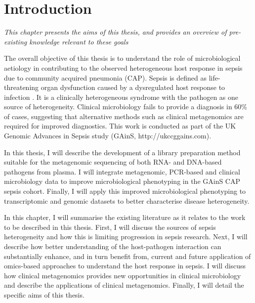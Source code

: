 \chapter{Introduction}
\label{ch:Introduction}
\textit{This chapter presents the aims of this thesis, and provides an overview of pre-existing knowledge relevant to these goals}

\startcontents[chapters]{\vspace{-1.4cm}}
\singlespacing
{}
\doublespacing
\vspace{0.5cm}

The overall objective of this thesis is to understand the role of microbiological aetiology in contributing to the observed heterogeneous host response in sepsis due to community acquired pneumonia (CAP). Sepsis is defined as life-threatening organ dysfunction caused by a dysregulated host response to infection \parencite{Singer2016}. It is a clinically heterogeneous syndrome with the pathogen as one source of heterogeneity. Clinical microbiology fails to provide a diagnosis in 60\% of cases, suggesting that alternative methods such as clinical metagenomics are required for improved diagnostics. This work is conducted as part of the UK Genomic Advances in Sepsis study (GAinS, http://ukccggains.com). 

In this thesis, I will describe the development of a library preparation method suitable for the metagenomic sequencing of both RNA- and DNA-based pathogens from plasma. I will integrate metagenomic, PCR-based and clinical microbiology data to improve microbiological phenotyping in the GAinS CAP sepsis cohort. Finally, I will apply this improved microbiological phenotyping to transcriptomic and genomic datasets to better characterise disease heterogeneity. 

In this chapter, I will summarise the existing literature as it relates to the work to be described in this thesis. First, I will discuss the sources of sepsis heterogeneity and how this is limiting progression in sepsis research. Next, I will describe how better understanding of the host-pathogen interaction can substantially enhance, and in turn benefit from, current and future application of omics-based approaches to understand the host response in sepsis. I will discuss how clinical metagenomics provides new opportunities in clinical microbiology and describe the applications of clinical metagenomics. Finally, I will detail the specific aims of this thesis. 

